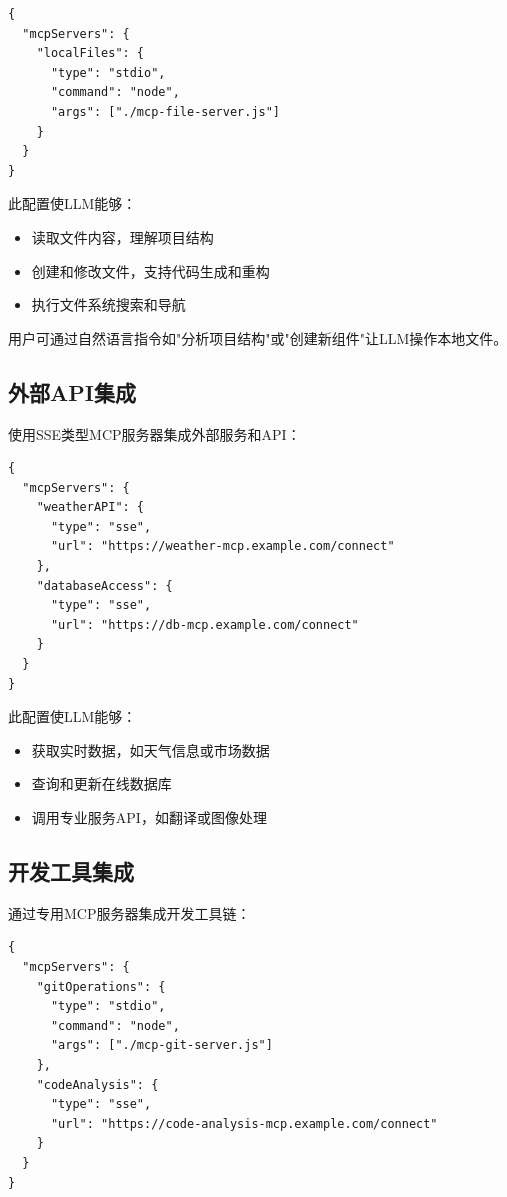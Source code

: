 \begin{verbatim}
{
  "mcpServers": {
    "localFiles": {
      "type": "stdio",
      "command": "node",
      "args": ["./mcp-file-server.js"]
    }
  }
}
\end{verbatim}

此配置使LLM能够：
\begin{itemize}
  \item 读取文件内容，理解项目结构
  \item 创建和修改文件，支持代码生成和重构
  \item 执行文件系统搜索和导航
\end{itemize}

用户可通过自然语言指令如"分析项目结构"或"创建新组件"让LLM操作本地文件。

\subsection{外部API集成}

使用SSE类型MCP服务器集成外部服务和API：

\begin{verbatim}
{
  "mcpServers": {
    "weatherAPI": {
      "type": "sse",
      "url": "https://weather-mcp.example.com/connect"
    },
    "databaseAccess": {
      "type": "sse",
      "url": "https://db-mcp.example.com/connect"
    }
  }
}
\end{verbatim}

此配置使LLM能够：
\begin{itemize}
  \item 获取实时数据，如天气信息或市场数据
  \item 查询和更新在线数据库
  \item 调用专业服务API，如翻译或图像处理
\end{itemize}

\subsection{开发工具集成}

通过专用MCP服务器集成开发工具链：

\begin{verbatim}
{
  "mcpServers": {
    "gitOperations": {
      "type": "stdio",
      "command": "node",
      "args": ["./mcp-git-server.js"]
    },
    "codeAnalysis": {
      "type": "sse",
      "url": "https://code-analysis-mcp.example.com/connect"
    }
  }
}
\end{verbatim}

